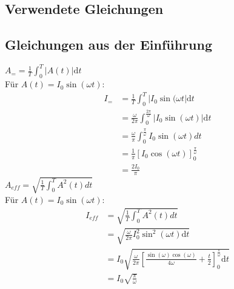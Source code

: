 

\subsection{Verwendete Gleichungen}\label{VGuD}








\subsection{Gleichungen aus der Einführung}
$A_= =\frac{1}{T}\int_{0}^{T}|A(t)|\text{d}t$\\
Für $A(t)=I_0\sin (\omega t)$:
\begin{align*}
	I_=  &=\frac{1}{T}\int_{0}^{T}|I_0\sin (\omega t|\text{d}t\\
		&=\frac{\omega}{2\pi}\int_{0}^{\frac{2\pi}{\omega}}|I_0\sin (\omega t)| \text{d}t\\
		&=\frac{\omega}{\pi}\int_{0}^{\frac{\pi}{\omega}}I_0\sin (\omega t) dt\\
		&=\frac{1}{\pi}\left[ I_0\cos(\omega t) \right]_0^{\frac{\pi}{\omega}}\\
		&=\frac{2I_0}{\pi}
\end{align*}
$A_{eff}=\sqrt{\frac{1}{T}\int_{0}^{T} A^2(t)dt}$\\
Für $A(t)=I_0\sin (\omega t)$:
\begin{align*}
	I_{eff}&=\sqrt{\frac{1}{T}\int_{0}^{T} A^2(t)dt}	\\
		   &=\sqrt{\frac{\omega}{2\pi}I_0^2\sin^2 (\omega t)\text{d}t}\\
		   &=I_0\sqrt{\frac{\omega}{2\pi}\left[  \frac{\sin(\omega)\cos(\omega)}{4\omega}+\frac{t}{2} \right]_0^{\frac{\pi}{\omega}}\text{d}t}\\
		   &=I_0\sqrt{\frac{\pi}{\omega}}
\end{align*}